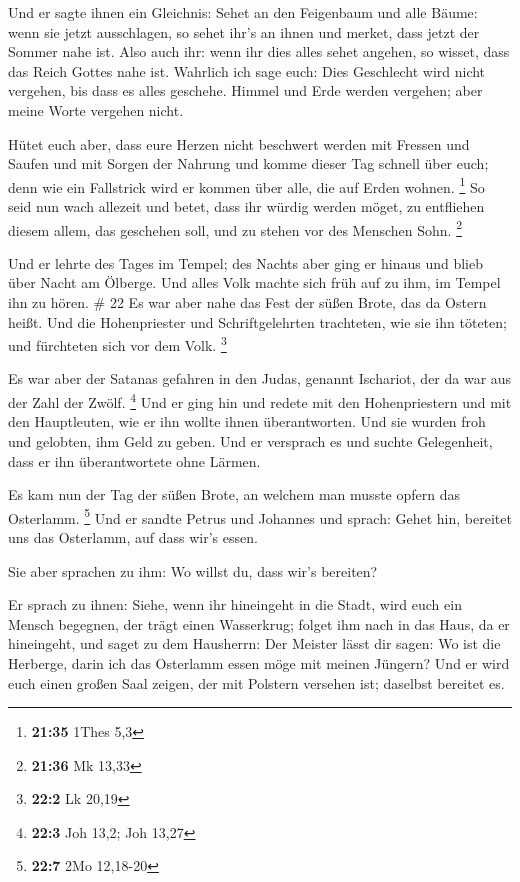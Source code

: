  Und er sagte ihnen ein Gleichnis: Sehet an den
Feigenbaum und alle Bäume:  wenn sie jetzt ausschlagen,
so sehet ihr's an ihnen und merket, dass jetzt der Sommer nahe ist.
 Also auch ihr: wenn ihr dies alles sehet angehen, so
wisset, dass das Reich Gottes nahe ist.  Wahrlich ich
sage euch: Dies Geschlecht wird nicht vergehen, bis dass es alles
geschehe.  Himmel und Erde werden vergehen; aber meine
Worte vergehen nicht.

 Hütet euch aber, dass eure Herzen nicht beschwert werden
mit Fressen und Saufen und mit Sorgen der Nahrung und komme dieser Tag
schnell über euch;  denn wie ein Fallstrick wird er
kommen über alle, die auf Erden wohnen. \footnote{\textbf{21:35} 1Thes
  5,3}  So seid nun wach allezeit und betet, dass ihr
würdig werden möget, zu entfliehen diesem allem, das geschehen soll, und
zu stehen vor des Menschen Sohn. \footnote{\textbf{21:36} Mk 13,33}

 Und er lehrte des Tages im Tempel; des Nachts aber ging
er hinaus und blieb über Nacht am Ölberge.  Und alles
Volk machte sich früh auf zu ihm, im Tempel ihn zu hören. \# 22
 Es war aber nahe das Fest der süßen Brote, das da Ostern
heißt.  Und die Hohenpriester und Schriftgelehrten
trachteten, wie sie ihn töteten; und fürchteten sich vor dem Volk.
\footnote{\textbf{22:2} Lk 20,19}

 Es war aber der Satanas gefahren in den Judas, genannt
Ischariot, der da war aus der Zahl der Zwölf. \footnote{\textbf{22:3}
  Joh 13,2; Joh 13,27}  Und er ging hin und redete mit den
Hohenpriestern und mit den Hauptleuten, wie er ihn wollte ihnen
überantworten.  Und sie wurden froh und gelobten, ihm Geld
zu geben.  Und er versprach es und suchte Gelegenheit,
dass er ihn überantwortete ohne Lärmen.

 Es kam nun der Tag der süßen Brote, an welchem man musste
opfern das Osterlamm. \footnote{\textbf{22:7} 2Mo 12,18-20}
 Und er sandte Petrus und Johannes und sprach: Gehet hin,
bereitet uns das Osterlamm, auf dass wir's essen.

 Sie aber sprachen zu ihm: Wo willst du, dass wir's
bereiten?

 Er sprach zu ihnen: Siehe, wenn ihr hineingeht in die
Stadt, wird euch ein Mensch begegnen, der trägt einen Wasserkrug; folget
ihm nach in das Haus, da er hineingeht,  und saget zu dem
Hausherrn: Der Meister lässt dir sagen: Wo ist die Herberge, darin ich
das Osterlamm essen möge mit meinen Jüngern?  Und er wird
euch einen großen Saal zeigen, der mit Polstern versehen ist; daselbst
bereitet es.

